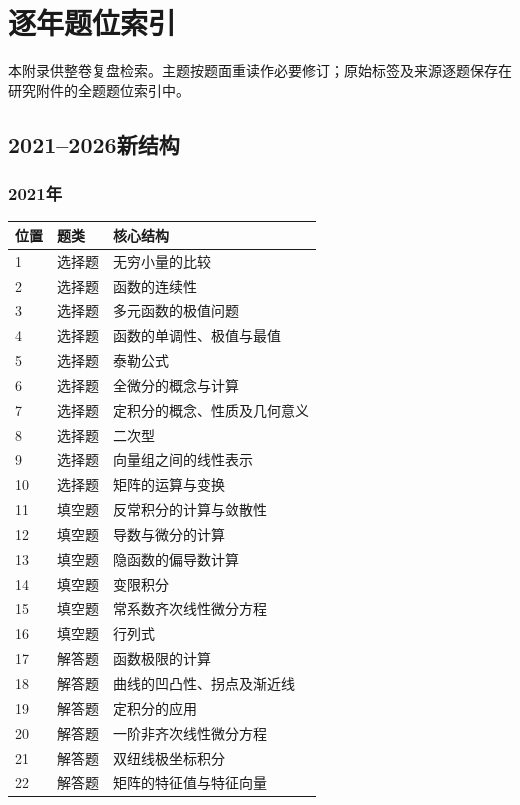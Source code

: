 \chapter{逐年题位索引}
本附录供整卷复盘检索。主题按题面重读作必要修订；原始标签及来源逐题保存在研究附件的全题题位索引中。
\section{2021--2026新结构}
\small
\subsection*{2021年}
\begin{longtable}{p{9mm}p{25mm}p{109mm}}\toprule 位置&题类&核心结构\\\midrule\endhead
1&选择题&无穷小量的比较\\
2&选择题&函数的连续性\\
3&选择题&多元函数的极值问题\\
4&选择题&函数的单调性、极值与最值\\
5&选择题&泰勒公式\\
6&选择题&全微分的概念与计算\\
7&选择题&定积分的概念、性质及几何意义\\
8&选择题&二次型\\
9&选择题&向量组之间的线性表示\\
10&选择题&矩阵的运算与变换\\
11&填空题&反常积分的计算与敛散性\\
12&填空题&导数与微分的计算\\
13&填空题&隐函数的偏导数计算\\
14&填空题&变限积分\\
15&填空题&常系数齐次线性微分方程\\
16&填空题&行列式\\
17&解答题&函数极限的计算\\
18&解答题&曲线的凹凸性、拐点及渐近线\\
19&解答题&定积分的应用\\
20&解答题&一阶非齐次线性微分方程\\
21&解答题&双纽线极坐标积分\\
22&解答题&矩阵的特征值与特征向量\\
\bottomrule\end{longtable}

